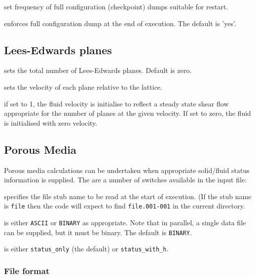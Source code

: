 set frequency of full configuration (checkpoint) dumps suitable
for restart.


enforces full configuration dump at the end of execution. The
default is 'yes'.

\subsection{Lees-Edwards planes}


sets the total number of Lees-Edwards planes. Default is zero.


sets the velocity of each plane relative to the lattice.


if set to 1, the fluid velocity is initialise to reflect a steady
state shear flow appropriate for the number of planes at the
given velocity. If set to zero, the fluid is initialised with
zero velocity.


\subsection{Porous Media}

Porous media calculations can be undertaken when appropriate
solid/fluid status information is supplied. The are a number
of switches available in the input file:


specifies the file stub name to be read at the start of execution.
(If the stub name is \texttt{file} then the code will expect to
find \texttt{file.001-001} in the current directory.


is either \texttt{ASCII} or \texttt{BINARY} as appropriate. Note that
in parallel, a single data file can be supplied, but it must be binary.
The default is \texttt{BINARY}.


is either \texttt{status\_only} (the default) or \texttt{status\_with\_h}.

\subsubsection{File format}


